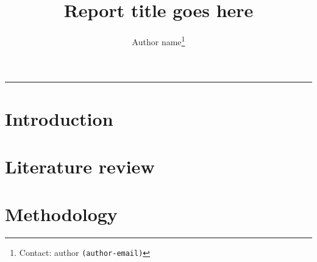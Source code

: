 
\newcommand{\COMMENT}{\textcolor{red}}
\newcommand{\ADDCITATION}{\COMMENT{(ADD CITATION)}}
\newcommand{\ADDFIGURE}{\COMMENT{(ADD FIGURE)}}
\newcommand{\ADDTABLE}{\COMMENT{(ADD TABLE)}}

\newcommand{\say}[2]{\hfill\small\enquote{\textit{#1}}{ - \small\textsc{#2}.}}

\newcommand{\question}{\textcolor{RoyalBlue}}










\title{\vspace{-0.75in}\large{Report title goes here}}
\author[]{Author name\footnote{Contact: author  \texttt{(author-email)}}} 
\date{}
\maketitle
\vspace{-0.5cm} \hrule



\setcounter{page}{1}
\section{Introduction}


\section{Literature review}



\section{Methodology}



